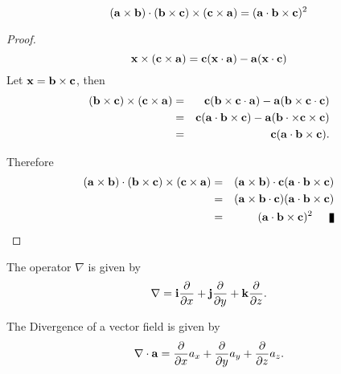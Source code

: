 \begin{theorem}
\[ ({\bf a} \times {\bf b})\cdot ({\bf b}\times {\bf c}) \times ({\bf c}\times {\bf a}) = ({\bf a}\cdot {\bf b} \times {\bf c})^2 \]
\end{theorem}

\begin{proof}
\[ {\bf x} \times ({\bf c}\times {\bf a}) = {\bf c}({\bf x}\cdot {\bf a}) - {\bf a}({\bf x}\cdot {\bf c}) \]
Let ${\bf x} = {\bf b} \times {\bf c}$, then 
\begin{eqnarray*}
({\bf b}\times {\bf c}) \times ({\bf c}\times {\bf a}) & =&  {\bf c}({\bf b}\times {\bf c} \cdot {\bf a}) - {\bf a}({\bf b}\times{\bf c}\cdot {\bf c}) \\
                                                                                   & =&  {\bf c}({\bf a}\cdot {\bf b} \times {\bf c}) - {\bf a}({\bf b}\cdot \times{\bf c}\times {\bf c}) \\
                                                                                   & =&  {\bf c}({\bf a}\cdot {\bf b} \times {\bf c}).
\end{eqnarray*}

Therefore 
\begin{eqnarray*}
({\bf a} \times {\bf b})\cdot ({\bf b}\times {\bf c}) \times ({\bf c}\times {\bf a}) & =&  ({\bf a} \times {\bf b})\cdot {\bf c}({\bf a}\cdot {\bf b} \times {\bf c})\\
                                                                                                                                & =&  ({\bf a} \times {\bf b}\cdot {\bf c})({\bf a}\cdot {\bf b} \times {\bf c})\\
                                                                                   & =&  ({\bf a}\cdot {\bf b} \times {\bf c})^2 \qed\\
\end{eqnarray*}
\end{proof}

\begin{definition}The operator $\nabla$ is given by
\[ \nabla = {\bf i}{\partial\over\partial x} + {\bf j}{\partial\over\partial y} + {\bf k}{\partial\over\partial z}.\]
\end{definition}

\begin{definition}
The Divergence of a vector field is given by
\[ \nabla\cdot{\bf a} = {\partial\over\partial x} a_x +{\partial\over\partial y} a_y +{\partial\over\partial z} a_z.\]
\end{definition}

